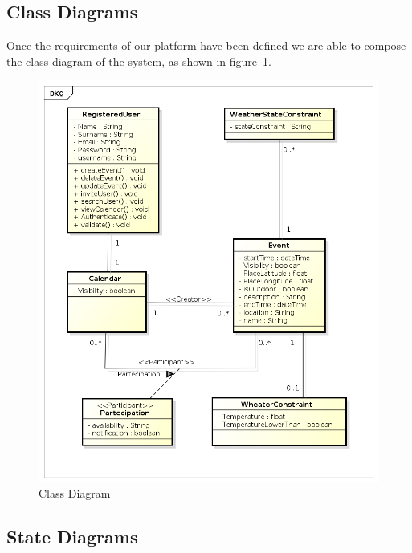 \subsection{Class Diagrams}
Once the requirements of our platform have been defined we are able to compose the class diagram  of the system, as shown in figure~\ref{fig:classdiagram}.
\begin{center}
 \begin{figure}[H]
    \includegraphics[width=1\textwidth]{./UMLDiagram/class/WeatherCalClassDiagram/ClassDiagram0.png}
    \caption{Class Diagram}
     \label{fig:classdiagram}
     \end{figure}
   \end{center}
\subsection{State Diagrams}
